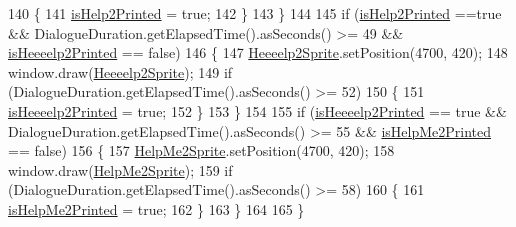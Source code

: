 \begin{DoxyCode}
140             \{
141                 \hyperlink{classDialogue_ad2233869defe9632464912f8ebc0d1e8}{isHelp2Printed} = \textcolor{keyword}{true};
142             \}
143         \}
144 
145         \textcolor{keywordflow}{if} (\hyperlink{classDialogue_ad2233869defe9632464912f8ebc0d1e8}{isHelp2Printed} ==\textcolor{keyword}{true} && DialogueDuration.getElapsedTime().asSeconds() >= 49 && 
      \hyperlink{classDialogue_a51700a11ffc543cbf5b71b753be4e7ed}{isHeeeelp2Printed} == \textcolor{keyword}{false})
146         \{
147             \hyperlink{classDialogue_a0ab086e2f989569384267e69b3ecc7a1}{Heeeelp2Sprite}.setPosition(4700, 420);
148             window.draw(\hyperlink{classDialogue_a0ab086e2f989569384267e69b3ecc7a1}{Heeeelp2Sprite});
149             \textcolor{keywordflow}{if} (DialogueDuration.getElapsedTime().asSeconds() >= 52)
150             \{
151                 \hyperlink{classDialogue_a51700a11ffc543cbf5b71b753be4e7ed}{isHeeeelp2Printed} = \textcolor{keyword}{true};
152             \}
153         \}
154 
155         \textcolor{keywordflow}{if} (\hyperlink{classDialogue_a51700a11ffc543cbf5b71b753be4e7ed}{isHeeeelp2Printed} == \textcolor{keyword}{true} && DialogueDuration.getElapsedTime().asSeconds() >= 
      55 && \hyperlink{classDialogue_a32d1cdc3bc3992e0b7cc733af8cd901a}{isHelpMe2Printed} == \textcolor{keyword}{false})
156         \{
157             \hyperlink{classDialogue_a252494e50a49bc206f1306d445deee80}{HelpMe2Sprite}.setPosition(4700, 420);
158             window.draw(\hyperlink{classDialogue_a252494e50a49bc206f1306d445deee80}{HelpMe2Sprite});
159             \textcolor{keywordflow}{if} (DialogueDuration.getElapsedTime().asSeconds() >= 58)
160             \{
161                 \hyperlink{classDialogue_a32d1cdc3bc3992e0b7cc733af8cd901a}{isHelpMe2Printed} = \textcolor{keyword}{true};
162             \}
163         \}
164 
165     \}
\end{DoxyCode}
